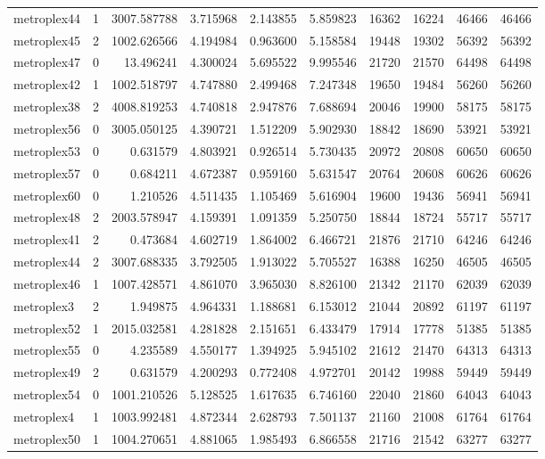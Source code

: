 \begin{longtable}{|l|r|r|r|r|r|r|r|r|r|}
metroplex44 & 1 & 3007.587788 & 3.715968 & 2.143855 & 5.859823 & 16362 & 16224 & 46466 & 46466 \\
metroplex45 & 2 & 1002.626566 & 4.194984 & 0.963600 & 5.158584 & 19448 & 19302 & 56392 & 56392 \\
metroplex47 & 0 & 13.496241 & 4.300024 & 5.695522 & 9.995546 & 21720 & 21570 & 64498 & 64498 \\
metroplex42 & 1 & 1002.518797 & 4.747880 & 2.499468 & 7.247348 & 19650 & 19484 & 56260 & 56260 \\
metroplex38 & 2 & 4008.819253 & 4.740818 & 2.947876 & 7.688694 & 20046 & 19900 & 58175 & 58175 \\
metroplex56 & 0 & 3005.050125 & 4.390721 & 1.512209 & 5.902930 & 18842 & 18690 & 53921 & 53921 \\
metroplex53 & 0 & 0.631579 & 4.803921 & 0.926514 & 5.730435 & 20972 & 20808 & 60650 & 60650 \\
metroplex57 & 0 & 0.684211 & 4.672387 & 0.959160 & 5.631547 & 20764 & 20608 & 60626 & 60626 \\
metroplex60 & 0 & 1.210526 & 4.511435 & 1.105469 & 5.616904 & 19600 & 19436 & 56941 & 56941 \\
metroplex48 & 2 & 2003.578947 & 4.159391 & 1.091359 & 5.250750 & 18844 & 18724 & 55717 & 55717 \\
metroplex41 & 2 & 0.473684 & 4.602719 & 1.864002 & 6.466721 & 21876 & 21710 & 64246 & 64246 \\
metroplex44 & 2 & 3007.688335 & 3.792505 & 1.913022 & 5.705527 & 16388 & 16250 & 46505 & 46505 \\
metroplex46 & 1 & 1007.428571 & 4.861070 & 3.965030 & 8.826100 & 21342 & 21170 & 62039 & 62039 \\
metroplex3 & 2 & 1.949875 & 4.964331 & 1.188681 & 6.153012 & 21044 & 20892 & 61197 & 61197 \\
metroplex52 & 1 & 2015.032581 & 4.281828 & 2.151651 & 6.433479 & 17914 & 17778 & 51385 & 51385 \\
metroplex55 & 0 & 4.235589 & 4.550177 & 1.394925 & 5.945102 & 21612 & 21470 & 64313 & 64313 \\
metroplex49 & 2 & 0.631579 & 4.200293 & 0.772408 & 4.972701 & 20142 & 19988 & 59449 & 59449 \\
metroplex54 & 0 & 1001.210526 & 5.128525 & 1.617635 & 6.746160 & 22040 & 21860 & 64043 & 64043 \\
metroplex4 & 1 & 1003.992481 & 4.872344 & 2.628793 & 7.501137 & 21160 & 21008 & 61764 & 61764 \\
metroplex50 & 1 & 1004.270651 & 4.881065 & 1.985493 & 6.866558 & 21716 & 21542 & 63277 & 63277 \\

\end{longtable}
